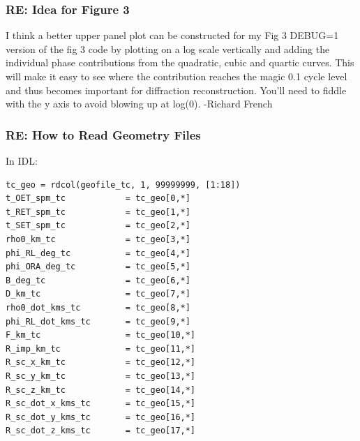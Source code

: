 \documentclass[crop=false,class=article,oneside]{standalone}
\begin{document}
\subsubsection{\footnotesize RE: Idea for Figure 3}
I think a better upper panel plot can be constructed for my Fig 3 DEBUG=1 version of the fig 3 code by plotting on a log scale vertically and adding the individual phase contributions from the quadratic, cubic and quartic curves. This will make it easy to see where the contribution reaches the magic 0.1 cycle level and thus becomes important for diffraction reconstruction. You'll need to fiddle with the y axis to avoid blowing up at log(0). -Richard French
\subsubsection{\footnotesize RE: How to Read Geometry Files}
In IDL:
\begin{lstlisting}[language=IDL]
tc_geo = rdcol(geofile_tc, 1, 99999999, [1:18])
t_OET_spm_tc            = tc_geo[0,*]
t_RET_spm_tc            = tc_geo[1,*]
t_SET_spm_tc            = tc_geo[2,*]
rho0_km_tc              = tc_geo[3,*]
phi_RL_deg_tc           = tc_geo[4,*]
phi_ORA_deg_tc          = tc_geo[5,*]
B_deg_tc                = tc_geo[6,*]
D_km_tc                 = tc_geo[7,*]
rho0_dot_kms_tc         = tc_geo[8,*]
phi_RL_dot_kms_tc       = tc_geo[9,*]
F_km_tc                 = tc_geo[10,*]
R_imp_km_tc             = tc_geo[11,*]
R_sc_x_km_tc            = tc_geo[12,*]
R_sc_y_km_tc            = tc_geo[13,*]
R_sc_z_km_tc            = tc_geo[14,*]
R_sc_dot_x_kms_tc       = tc_geo[15,*]
R_sc_dot_y_kms_tc       = tc_geo[16,*]
R_sc_dot_z_kms_tc       = tc_geo[17,*]
\end{lstlisting}
\end{document}

